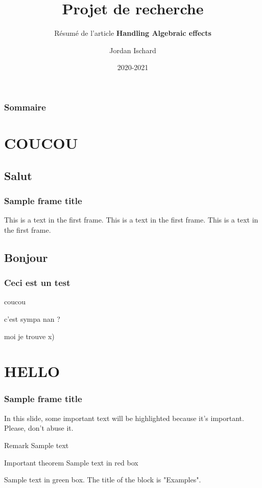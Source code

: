 \documentclass{beamer}
\title{Projet de recherche}
\subtitle{Résumé de l'article \textbf{Handling Algebraic effects}}
\author{Jordan Ischard}
\institute{Université d'Orléans}
\date{2020-2021}
\begin{document}

\AtBeginSubsection
{
  \begin{frame} 
	\frametitle{Sommaire}
	\tableofcontents[sectionstyle=show/hide,subsectionstyle=show/shaded/hide]
  \end{frame}
}



\frame{\titlepage}

\section{COUCOU}

\subsection{Salut}
\begin{frame}
\frametitle{Sample frame title}
This is a text in the first frame. This is a text in the first frame. This is a text in the first frame.
\end{frame}

\subsection{Bonjour}
\begin{frame}
	\frametitle{Ceci est un test}

	coucou\pause

	c'est sympa nan ?\pause

	moi je trouve x)
\end{frame}


\section{HELLO}
\begin{frame}
	\frametitle{Sample frame title}
	
	In this slide, some important text will be
	\alert{highlighted} because it's important.
	Please, don't abuse it.
	
	\begin{block}{Remark}
	Sample text
	\end{block}
	
	\begin{alertblock}{Important theorem}
	Sample text in red box
	\end{alertblock}
	
	\begin{examples}
	Sample text in green box. The title of the block is "Examples".
	\end{examples}
\end{frame}
\end{document}
